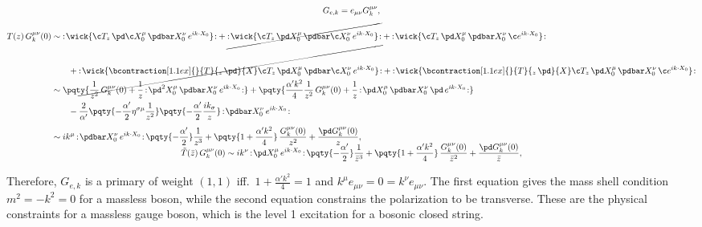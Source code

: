 \documentclass[a4paper,10pt]{article}
\begin{document}
\begin{enumerate}
\begin{enumerate}
	\begin{gather}
		G_{e,k}
		= e_{\mu\nu} G^{\mu\nu}_k,\\[1ex]
	\begin{aligned}
		T(z)\,G^{\mu\nu}_k(0)
		&\sim \normorder{\wick{
				\c T_z\,
				\pd \c X^\mu_0\,
				\pdbar X^\nu_0\,
				e^{ik\cdot X_0}
			}}
			+ \cancel{\normorder{\wick{
				\c T_z\,
				\pd X^\mu_0\,
				\pdbar \c X^\nu_0\,
				e^{ik\cdot X_0}
			}}}
			+ \normorder{\wick{
				\c T_z\,
				\pd X^\mu_0\,
				\pdbar X^\nu_0\,
				\c e^{ik\cdot X_0}
			}}
			\\ &\qquad
			+ \cancel{\normorder{\wick{
				\bcontraction[1.1ex]{}{T}{_z\,\pd}{X}
				\c T_z\,
				\pd X^\mu_0\,
				\pdbar \c X^\nu_0\,
				e^{ik\cdot X_0}
			}}}
			+ \normorder{\wick{
				\bcontraction[1.1ex]{}{T}{_z\,\pd}{X}
				\c T_z\,
				\pd X^\mu_0\,
				\pdbar X^\nu_0\,
				\c e^{ik\cdot X_0}
			}}
		\\
		&\sim \pqty{
				\frac{1}{z^2}\, G^{\mu\nu}_k(0)
				+ \frac{1}{z}\, \normorder{
					\pd^2 X^\mu_0\,
					\pdbar X^\nu_0\,
					e^{ik\cdot X_0}
				}
			}
			+ \pqty{
				\frac{\alpha'k^2}{4}
				\frac{1}{z^2}\, G^{\mu\nu}_k(0)
				+ \frac{1}{z}\, \normorder{
					\pd X^\mu_0\,
					\pdbar X^\nu_0\,
					\pd\,e^{ik\cdot X_0}
				}
			}
			\\ &\qquad
			- \frac{2}{\alpha'}
				\pqty{
					-\frac{\alpha'}{2}
					\eta^{\sigma\mu}
					\frac{1}{z^2}
				} \pqty{
					-\frac{\alpha'}{2}
					\frac{ik_\sigma}{z}
				}\, \normorder{
					\pdbar X^\nu_0\,
					e^{ik\cdot X_0}
				}
		\\[1ex]
		&\sim
			ik^\mu\,\normorder{
					\pdbar X^\nu_0\,
					e^{ik\cdot X_0}
				}\,
				\pqty{-\frac{\alpha'}{2}}
				\frac{1}{z^3}
			+ \pqty{
					1 + \frac{\alpha'k^2}{4}
				}\, \frac{G^{\mu\nu}_k(0)}{z^2}
			+ \frac{\pd G^{\mu\nu}_k(0)}{z},
		\\[-1.25\baselineskip]
	\end{aligned}\\[.8\baselineskip]
		\tilde{T}(\bar{z})\,G^{\mu\nu}_k(0)
		\sim
			ik^\nu\,\normorder{
					\pd X^\mu_0\,
					e^{ik\cdot X_0}
				}\,
				\pqty{-\frac{\alpha'}{2}}
				\frac{1}{\bar{z}^3}
			+ \pqty{
					1 + \frac{\alpha'k^2}{4}
				}\, 
				\frac{G^{\mu\nu}_k(0)}{\bar{z}^2}
			+ \frac{\pd G^{\mu\nu}_k(0)}{\bar{z}},
	\end{gather}
	
	\noindent
	Therefore, $G_{e,k}$ is a primary of weight $(1,1)$ iff.~$
		1 + \frac{\alpha'k^2}{4} = 1
	$ and $
		k^\mu e_{\mu\nu}
		= 0 = k^\nu e_{\mu\nu}
	$. The first equation gives the mass shell condition $
		m^2 = -k^2 = 0
	$ for a massless boson, while the second equation constrains the polarization to be transverse. These are the physical constraints for a massless gauge boson, which is the level 1 excitation for a bosonic closed string. 
	

\end{enumerate}
\end{enumerate}
\end{document}
